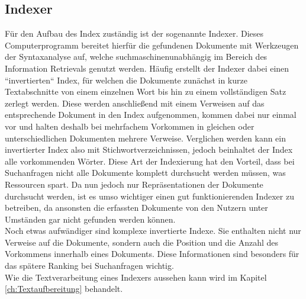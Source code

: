 \subsection{Indexer}
Für den Aufbau des Index zuständig ist der sogenannte Indexer. Dieses Computerprogramm bereitet hierfür die gefundenen Dokumente mit Werkzeugen der Syntaxanalyse auf, welche suchmaschinenunabhängig im Bereich des Information Retrievals genutzt werden. Häufig erstellt der Indexer dabei einen ``invertierten`` Index, für welchen die Dokumente zunächst in kurze Textabschnitte von einem einzelnen Wort bis hin zu einem vollständigen Satz zerlegt werden. Diese werden anschließend mit einem Verweisen auf das entsprechende Dokument in den Index aufgenommen, kommen dabei nur einmal vor und halten deshalb bei mehrfachem Vorkommen in gleichen oder unterschiedlichen Dokumenten mehrere Verweise. Verglichen werden kann ein invertierter Index also mit Stichwortverzeichnissen, jedoch beinhaltet der Index alle vorkommenden Wörter. Diese Art der Indexierung hat den Vorteil, dass bei Suchanfragen nicht alle Dokumente komplett durchsucht werden müssen, was Ressourcen spart. Da nun jedoch nur Repräsentationen der Dokumente durchsucht werden, ist es umso wichtiger einen gut funktionierenden Indexer zu betreiben, da ansonsten die erfassten Dokumente von den Nutzern unter Umständen gar nicht gefunden werden können.\\
Noch etwas aufwändiger sind komplexe invertierte Indexe. Sie enthalten nicht nur Verweise auf die Dokumente, sondern auch die Position und die Anzahl des Vorkommens innerhalb eines Dokuments. Diese Informationen sind besonders für das spätere Ranking bei Suchanfragen wichtig.\\
Wie die Textverarbeitung eines Indexers aussehen kann wird im Kapitel \ref{ch:Textaufbereitung} behandelt.